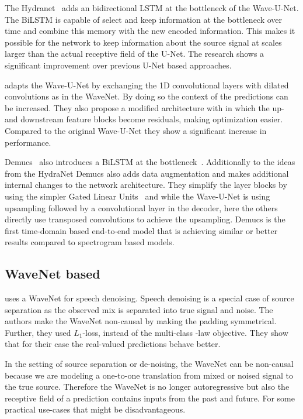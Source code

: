 The Hydranet~\cite{kaspersenHydraNet2019} adds an bidirectional LSTM at the bottleneck of the Wave-U-Net. The BiLSTM is capable of select and keep information at the bottleneck over time and combine this memory with the new encoded information. This makes it possible for the network to keep information about the source signal at scales larger than the actual receptive field of the U-Net. The research shows a significant improvement over previous U-Net based approaches.

\textcite{narayanaswamyAudio2019} adapts the Wave-U-Net by exchanging the 1D convolutional layers with dilated convolutions as in the WaveNet. By doing so the context of the predictions can be increased. They also propose a modified architecture with in which the up- and downstream feature blocks become residuals, making optimization easier. Compared to the original Wave-U-Net they show a significant increase in performance.

Demucs~\cite{defossezDemucs2019} also introduces a BiLSTM at the bottleneck~\cite{defossezSING2018}. Additionally to the ideas from the HydraNet Demucs also adds data augmentation and makes additional internal changes to the network architecture. They simplify the layer blocks by using the simpler Gated Linear Units~\cite{dauphinLanguage2017} and while the Wave-U-Net is using upsampling followed by a convolutional layer in the decoder, here the others directly use transposed convolutions to achieve the upsampling. Demucs is the first time-domain based end-to-end model that is achieving similar or better results compared to spectrogram based models.

\subsection{WaveNet based}
\textcite{rethageWavenet2018} uses a WaveNet for speech denoising. Speech denoising is a special case of source separation as the observed mix is separated into true signal and noise. The authors make the WaveNet non-causal by making the padding symmetrical. Further, they used \(L_1\)-loss, instead of the multi-class \μ-law objective. They show that for their case the real-valued predictions behave better.

In the setting of source separation or de-noising, the WaveNet can be non-causal because we are modeling a one-to-one translation from mixed or noised signal to the true source. Therefore the WaveNet is no longer autoregressive but also the receptive field of a  prediction contains inputs from the past and future. For some practical use-cases that might be disadvantageous.

